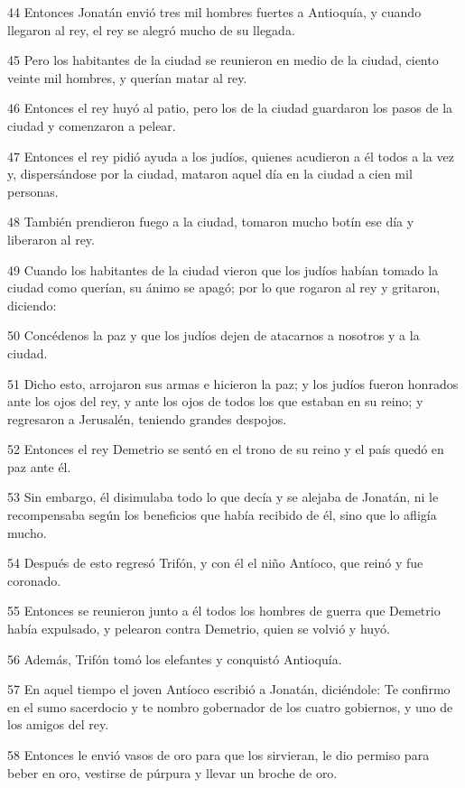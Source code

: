 \par 44 Entonces Jonatán envió tres mil hombres fuertes a Antioquía, y cuando llegaron al rey, el rey se alegró mucho de su llegada.
\par 45 Pero los habitantes de la ciudad se reunieron en medio de la ciudad, ciento veinte mil hombres, y querían matar al rey.
\par 46 Entonces el rey huyó al patio, pero los de la ciudad guardaron los pasos de la ciudad y comenzaron a pelear.
\par 47 Entonces el rey pidió ayuda a los judíos, quienes acudieron a él todos a la vez y, dispersándose por la ciudad, mataron aquel día en la ciudad a cien mil personas.
\par 48 También prendieron fuego a la ciudad, tomaron mucho botín ese día y liberaron al rey.
\par 49 Cuando los habitantes de la ciudad vieron que los judíos habían tomado la ciudad como querían, su ánimo se apagó; por lo que rogaron al rey y gritaron, diciendo:
\par 50 Concédenos la paz y que los judíos dejen de atacarnos a nosotros y a la ciudad.
\par 51 Dicho esto, arrojaron sus armas e hicieron la paz; y los judíos fueron honrados ante los ojos del rey, y ante los ojos de todos los que estaban en su reino; y regresaron a Jerusalén, teniendo grandes despojos.
\par 52 Entonces el rey Demetrio se sentó en el trono de su reino y el país quedó en paz ante él.
\par 53 Sin embargo, él disimulaba todo lo que decía y se alejaba de Jonatán, ni le recompensaba según los beneficios que había recibido de él, sino que lo afligía mucho.
\par 54 Después de esto regresó Trifón, y con él el niño Antíoco, que reinó y fue coronado.
\par 55 Entonces se reunieron junto a él todos los hombres de guerra que Demetrio había expulsado, y pelearon contra Demetrio, quien se volvió y huyó.
\par 56 Además, Trifón tomó los elefantes y conquistó Antioquía.
\par 57 En aquel tiempo el joven Antíoco escribió a Jonatán, diciéndole: Te confirmo en el sumo sacerdocio y te nombro gobernador de los cuatro gobiernos, y uno de los amigos del rey.
\par 58 Entonces le envió vasos de oro para que los sirvieran, le dio permiso para beber en oro, vestirse de púrpura y llevar un broche de oro.
